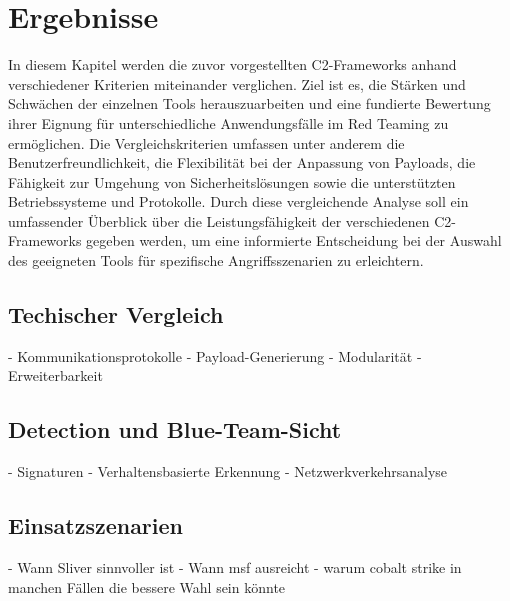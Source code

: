 \section{Ergebnisse}
In diesem Kapitel werden die zuvor vorgestellten C2-Frameworks anhand verschiedener Kriterien miteinander verglichen. Ziel ist es, die Stärken und Schwächen der einzelnen Tools herauszuarbeiten und eine fundierte Bewertung ihrer Eignung für unterschiedliche Anwendungsfälle im Red Teaming zu ermöglichen. Die Vergleichskriterien umfassen unter anderem die Benutzerfreundlichkeit, die Flexibilität bei der Anpassung von Payloads, die Fähigkeit zur Umgehung von Sicherheitslösungen sowie die unterstützten Betriebssysteme und Protokolle. Durch diese vergleichende Analyse soll ein umfassender Überblick über die Leistungsfähigkeit der verschiedenen C2-Frameworks gegeben werden, um eine informierte Entscheidung bei der Auswahl des geeigneten Tools für spezifische Angriffsszenarien zu erleichtern.
\subsection{Techischer Vergleich}
- Kommunikationsprotokolle
- Payload-Generierung
- Modularität
- Erweiterbarkeit
\subsection{Detection und Blue-Team-Sicht}
- Signaturen
- Verhaltensbasierte Erkennung
- Netzwerkverkehrsanalyse
\subsection{Einsatzszenarien}
- Wann Sliver sinnvoller ist
- Wann msf ausreicht
- warum cobalt strike in manchen Fällen die bessere Wahl sein könnte